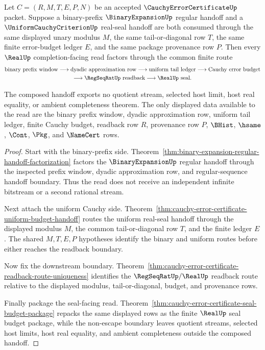\begin{theorem}
\label{thm:cauchy-error-certificate-composed-budget-readback-handoff}
Let $C=(R,M,T,E,P,N)$ be an accepted $\CauchyErrorCertificateUp$ packet. Suppose a binary-prefix $\BinaryExpansionUp$ regular handoff and a $\UniformCauchyCriterionUp$ real-seal handoff are both consumed through the same displayed unary modulus $M$, the same tail-or-diagonal row $T$, the same finite error-budget ledger $E$, and the same package provenance row $P$. Then every $\RealUp$ completion-facing read factors through the common finite route
$$
\begin{gathered}
\text{binary prefix window}
\longrightarrow
\text{dyadic approximation row}
\longrightarrow
\text{uniform tail ledger}
\longrightarrow
\text{Cauchy error budget}
\\
\longrightarrow
\RegSeqRatUp\text{ readback}
\longrightarrow
\RealUp\text{ seal}.
\end{gathered}
$$

The composed handoff exports no quotient stream, selected host limit, host real equality, or ambient completeness theorem. The only displayed data available to the read are the binary prefix window, dyadic approximation row, uniform tail ledger, finite Cauchy budget, readback row $R$, provenance row $P$, $\BHist$, $\hsame$, $\Cont$, $\Pkg$, and $\NameCert$ rows.
\end{theorem}
\begin{proof}
Start with the binary-prefix side. Theorem~\ref{thm:binary-expansion-regular-handoff-factorization} factors the $\BinaryExpansionUp$ regular handoff through the inspected prefix window, dyadic approximation row, and regular-sequence handoff boundary. Thus the read does not receive an independent infinite bitstream or a second rational stream.

Next attach the uniform Cauchy side. Theorem~\ref{thm:cauchy-error-certificate-uniform-budget-handoff} routes the uniform real-seal handoff through the displayed modulus $M$, the common tail-or-diagonal row $T$, and the finite ledger $E$. The shared $M,T,E,P$ hypotheses identify the binary and uniform routes before either reaches the readback boundary.

Now fix the downstream boundary. Theorem~\ref{thm:cauchy-error-certificate-readback-route-uniqueness} identifies the $\RegSeqRatUp/\RealUp$ readback route relative to the displayed modulus, tail-or-diagonal, budget, and provenance rows.

Finally package the seal-facing read. Theorem~\ref{thm:cauchy-error-certificate-seal-budget-package} repacks the same displayed rows as the finite $\RealUp$ seal budget package, while the non-escape boundary leaves quotient streams, selected host limits, host real equality, and ambient completeness outside the composed handoff.
\end{proof}

